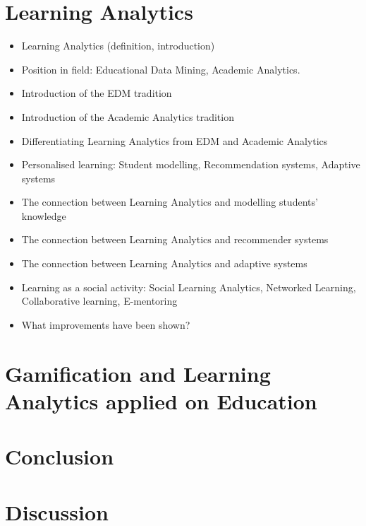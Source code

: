 \documentclass[10pt]{article}
\begin{document}
\section{Learning Analytics}
\begin{itemize}
\item Learning Analytics (definition, introduction)
\item Position in field: Educational Data Mining, Academic Analytics.
\item Introduction of the EDM tradition
\item Introduction of the Academic Analytics tradition
\item Differentiating Learning Analytics from EDM and Academic Analytics
\item Personalised learning: Student modelling, Recommendation systems, Adaptive systems
\item The connection between Learning Analytics and modelling students’ knowledge
\item The connection between Learning Analytics and recommender systems
\item The connection between Learning Analytics and adaptive systems
\item Learning as a social activity: Social Learning Analytics, Networked Learning, Collaborative learning, E-mentoring
\item What improvements have been shown?
\end{itemize}


\section{Gamification and Learning Analytics applied on Education}

\section{Conclusion}

\section{Discussion}


\pagebreak


\end{document}

